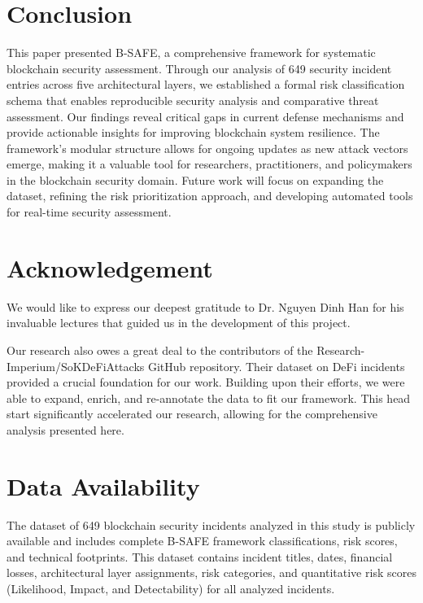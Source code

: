 \documentclass[a4paper]{article}
\begin{document}
\begin{multicols}{2}
\section{Conclusion}
This paper presented B-SAFE, a comprehensive framework for systematic blockchain security assessment. Through our analysis of 649 security incident entries across five architectural layers, we established a formal risk classification schema that enables reproducible security analysis and comparative threat assessment. Our findings reveal critical gaps in current defense mechanisms and provide actionable insights for improving blockchain system resilience. The framework's modular structure allows for ongoing updates as new attack vectors emerge, making it a valuable tool for researchers, practitioners, and policymakers in the blockchain security domain. Future work will focus on expanding the dataset, refining the risk prioritization approach, and developing automated tools for real-time security assessment. 

\section*{Acknowledgement}

We would like to express our deepest gratitude to Dr. Nguyen Dinh Han for his invaluable lectures that guided us in the development of this project.

Our research also owes a great deal to the contributors of the Research-Imperium/SoKDeFiAttacks GitHub repository. Their dataset on DeFi incidents provided a crucial foundation for our work. Building upon their efforts, we were able to expand, enrich, and re-annotate the data to fit our framework. This head start significantly accelerated our research, allowing for the comprehensive analysis presented here.

\section*{Data Availability}

The dataset of 649 blockchain security incidents analyzed in this study is publicly available and includes complete B-SAFE framework classifications, risk scores, and technical footprints. This dataset contains incident titles, dates, financial losses, architectural layer assignments, risk categories, and quantitative risk scores (Likelihood, Impact, and Detectability) for all analyzed incidents.


\end{multicols}
\end{document}
